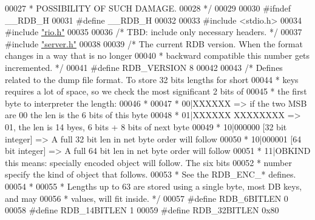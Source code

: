 \begin{DoxyCode}
00027 \textcolor{comment}{ * POSSIBILITY OF SUCH DAMAGE.}
00028 \textcolor{comment}{ */}
00029 
00030 \textcolor{preprocessor}{#}\textcolor{preprocessor}{ifndef} \textcolor{preprocessor}{\_\_RDB\_H}
00031 \textcolor{preprocessor}{#}\textcolor{preprocessor}{define} \textcolor{preprocessor}{\_\_RDB\_H}
00032 
00033 \textcolor{preprocessor}{#}\textcolor{preprocessor}{include} \textcolor{preprocessor}{<}\textcolor{preprocessor}{stdio}\textcolor{preprocessor}{.}\textcolor{preprocessor}{h}\textcolor{preprocessor}{>}
00034 \textcolor{preprocessor}{#}\textcolor{preprocessor}{include} \hyperlink{rio_8h}{"rio.h"}
00035 
00036 \textcolor{comment}{/* TBD: include only necessary headers. */}
00037 \textcolor{preprocessor}{#}\textcolor{preprocessor}{include} \hyperlink{server_8h}{"server.h"}
00038 
00039 \textcolor{comment}{/* The current RDB version. When the format changes in a way that is no longer}
00040 \textcolor{comment}{ * backward compatible this number gets incremented. */}
00041 \textcolor{preprocessor}{#}\textcolor{preprocessor}{define} \textcolor{preprocessor}{RDB\_VERSION} 8
00042 
00043 \textcolor{comment}{/* Defines related to the dump file format. To store 32 bits lengths for short}
00044 \textcolor{comment}{ * keys requires a lot of space, so we check the most significant 2 bits of}
00045 \textcolor{comment}{ * the first byte to interpreter the length:}
00046 \textcolor{comment}{ *}
00047 \textcolor{comment}{ * 00|XXXXXX => if the two MSB are 00 the len is the 6 bits of this byte}
00048 \textcolor{comment}{ * 01|XXXXXX XXXXXXXX =>  01, the len is 14 byes, 6 bits + 8 bits of next byte}
00049 \textcolor{comment}{ * 10|000000 [32 bit integer] => A full 32 bit len in net byte order will follow}
00050 \textcolor{comment}{ * 10|000001 [64 bit integer] => A full 64 bit len in net byte order will follow}
00051 \textcolor{comment}{ * 11|OBKIND this means: specially encoded object will follow. The six bits}
00052 \textcolor{comment}{ *           number specify the kind of object that follows.}
00053 \textcolor{comment}{ *           See the RDB\_ENC\_* defines.}
00054 \textcolor{comment}{ *}
00055 \textcolor{comment}{ * Lengths up to 63 are stored using a single byte, most DB keys, and may}
00056 \textcolor{comment}{ * values, will fit inside. */}
00057 \textcolor{preprocessor}{#}\textcolor{preprocessor}{define} \textcolor{preprocessor}{RDB\_6BITLEN} 0
00058 \textcolor{preprocessor}{#}\textcolor{preprocessor}{define} \textcolor{preprocessor}{RDB\_14BITLEN} 1
00059 \textcolor{preprocessor}{#}\textcolor{preprocessor}{define} \textcolor{preprocessor}{RDB\_32BITLEN} 0x80

\end{DoxyCode}
